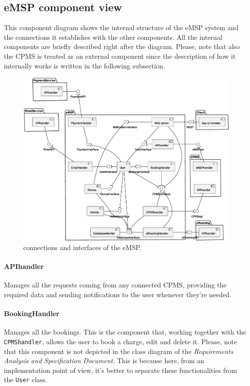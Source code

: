 \subsection{eMSP component view}

This component diagram shows the internal structure of the eMSP system and the connections it establishes with the other components. All the internal components are briefly described right after the diagram. Please, note that also the CPMS is treated as an external component since the description of how it internally works is written in the following subsection.

\begin{figure}[h!]
    \centering
    \includegraphics[width=\columnwidth]{./images/components/emsp}
    \caption{connections and interfaces of the eMSP.}
\end{figure}

\paragraph{APIhandler} Manages all the requests coming from any connected CPMS, providing the required data and sending notifications to the user whenever they're needed.

\paragraph{BookingHandler} Manages all the bookings. This is the component that, working together with the \linebreak \texttt{CPMShandler}, allows the user to book a charge, edit and delete it. Please, note that this component is not depicted in the class diagram of the \textit{Requirements Analysis and Specification Document}. This is because here, from an implementation point of view, it's better to separate these functionalities from the \texttt{User} class.

